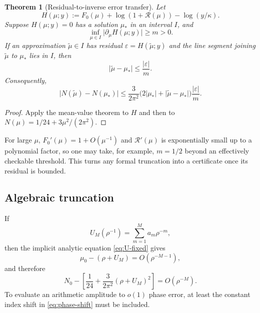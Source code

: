 \documentclass[11pt,a4paper]{article}
\numberwithin{equation}{section}
\newtheorem{theorem}{Theorem}[section]
\theoremstyle{definition}
\theoremstyle{remark}
\newcommand{\Rcal}{\mathcal R}
\newcommand{\abs}[1]{\lvert#1\rvert}
\begin{document}
\begin{theorem}[Residual-to-inverse error transfer]\label{thm:residual-transfer}
Let
\begin{equation}\label{eq:H-full}
 H(\mu;y):=F_0(\mu)+\log(1+\Rcal(\mu))-\log(y/\kappa).
\end{equation}
Suppose $H(\mu;y)=0$ has a solution $\mu_*$ in an interval $I$, and
\begin{equation}\label{eq:derivative-lower}
 \inf_{\mu\in I}\abs{\partial_\mu H(\mu;y)}\geq m>0.
\end{equation}
If an approximation $\widetilde\mu\in I$ has residual
$\varepsilon=H(\widetilde\mu;y)$ and the line segment joining
$\widetilde\mu$ to $\mu_*$ lies in $I$, then
\begin{equation}\label{eq:mu-error}
 \abs{\widetilde\mu-\mu_*}\leq\frac{\abs\varepsilon}{m}.
\end{equation}
Consequently,
\begin{equation}\label{eq:N-error-transfer}
 \abs{N(\widetilde\mu)-N(\mu_*)}
 \leq \frac{3}{2\pi^2}
 \bigl(2\abs{\mu_*}+\abs{\widetilde\mu-\mu_*}\bigr)
 \frac{\abs\varepsilon}{m}.
\end{equation}
\end{theorem}

\begin{proof}
Apply the mean-value theorem to $H$ and then to
$N(\mu)=1/24+3\mu^2/(2\pi^2)$.
\end{proof}

For large $\mu$, $F_0'(\mu)=1+O(\mu^{-1})$ and
$\Rcal'(\mu)$ is exponentially small up to a polynomial factor, so one may
take, for example, $m=1/2$ beyond an effectively checkable threshold.  This
turns any formal truncation into a certificate once its residual is bounded.

\subsection{Algebraic truncation}

If
\begin{equation}\label{eq:U-M}
 U_M(\rho^{-1})=\sum_{m=1}^{M}a_m\rho^{-m},
\end{equation}
then the implicit analytic equation \eqref{eq:U-fixed} gives
\begin{equation}\label{eq:U-M-error}
 \mu_0-(\rho+U_M)=O(\rho^{-M-1}),
\end{equation}
and therefore
\begin{equation}\label{eq:N0-M-error}
 N_0-\left[\frac1{24}+\frac{3}{2\pi^2}(\rho+U_M)^2\right]
 =O(\rho^{-M}).
\end{equation}
To evaluate an arithmetic amplitude to $o(1)$ phase error, at least the
constant index shift in \eqref{eq:phase-shift} must be included.
\end{document}

